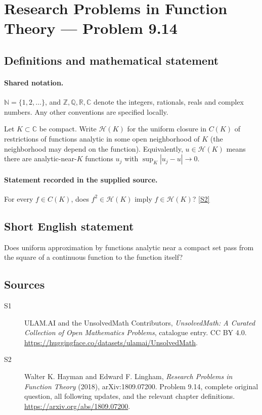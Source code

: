 \documentclass[11pt]{book}
\newcommand{\sref}[2]{\hyperlink{source:#1:#2}{[S#2]}}
\begin{document}
\section{Research Problems in Function Theory — Problem 9.14}\label{statement}

\subsection{Definitions and mathematical statement}

\paragraph{Shared notation.}$\mathbb N=\{1,2,\ldots\}$, and $\mathbb Z,\mathbb Q,\mathbb R,\mathbb C$ denote the integers, rationals, reals and complex numbers. Any other conventions are specified locally.


Let $K\subset\mathbb C$ be compact. Write $\mathcal H(K)$ for the uniform closure in $C(K)$ of restrictions of functions analytic in some open neighborhood of $K$ (the neighborhood may depend on the function). Equivalently, $u\in\mathcal H(K)$ means there are analytic-near-$K$ functions $u_j$ with $\sup_K|u_j-u|\to0$.
\paragraph{Statement recorded in the supplied source.}
For every $f\in C(K)$, does $f^2\in\mathcal H(K)$ imply $f\in\mathcal H(K)$? \sref{statement}{2}
\subsection{Short English statement}
Does uniform approximation by functions analytic near a compact set pass from the square of a continuous function to the function itself?
\subsection{Sources}
\begin{description}
\item[\hypertarget{source:statement:1}{S1}] ULAM.AI and the UnsolvedMath Contributors, \emph{UnsolvedMath: A Curated Collection of Open Mathematics Problems}, catalogue entry. CC BY 4.0. \url{https://huggingface.co/datasets/ulamai/UnsolvedMath}.
\item[\hypertarget{source:statement:2}{S2}] Walter K. Hayman and Edward F. Lingham, \emph{Research Problems in Function Theory} (2018), arXiv:1809.07200. Problem 9.14, complete original question, all following updates, and the relevant chapter definitions. \url{https://arxiv.org/abs/1809.07200}.
\end{description}
\label{end:statement}
\end{document}
